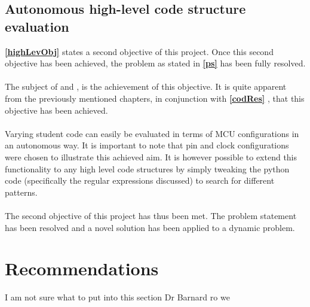 \subsection{Autonomous high-level code structure evaluation}
\textbf{\ref{highLevObj} } states a second objective of this project. Once this second objective has been achieved, the problem as stated in \textbf{\ref{ps} } has been fully resolved.
\\\\
The subject of \textbf{} and \textbf{}, is the achievement of this objective. It is quite apparent from the previously mentioned chapters, in conjunction with \textbf{\ref{codRes} }, that this objective has been achieved. 
\\\\
Varying student code can easily be evaluated in terms of MCU configurations in an autonomous way. It is important to note that pin and clock configurations were chosen to illustrate this achieved aim. It is however possible to extend this functionality to any high level code structures by simply tweaking the python code (specifically the regular expressions discussed) to search for different patterns.
\\\\
The second objective of this project has thus been met. The problem statement has been resolved and a novel solution has been applied to a dynamic problem.

\section{Recommendations}

\color{green} I am not sure what to put into this section Dr Barnard ro we\color{black}


